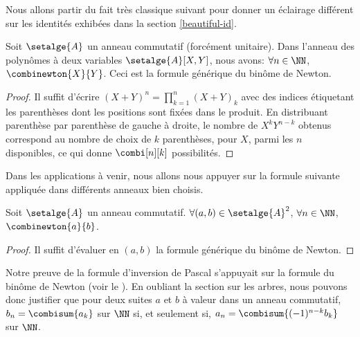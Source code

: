 Nous allons partir du fait très classique suivant pour donner un éclairage différent sur les identités exhibées dans la section \ref{beautiful-id}.




\begin{fact} \label{bino-id-formal}
    Soit $\setalge{A}$ un anneau commutatif (forcément unitaire).
    Dans l'anneau des polynômes à deux variables $\setalge{A}[X, Y]$, nous avons:
    $\forall n \in \NN$,
    $\combinewton{X}{Y}$.
    Ceci est la formule générique du binôme de Newton.
\end{fact}


\begin{proof}
    Il suffit d'écrire $(X + Y)^n = \prod_{k=1}^{n} (X + Y)_k$ avec des indices étiquetant les parenthèses dont les positions sont fixées dans le produit.
    En distribuant parenthèse par parenthèse de gauche à droite, le nombre de $X^k Y^{n-k}$ obtenus correspond au nombre de choix de $k$ parenthèses, pour $X$, parmi les $n$ disponibles, ce qui donne $\combi[n][k]$ possibilités.
\end{proof}




Dans les applications à venir, nous allons nous appuyer sur la formule suivante appliquée dans différents anneaux bien choisis.


\begin{fact} \label{bino-id-a-b}
    Soit $\setalge{A}$ un anneau commutatif.
    $\forall (a, b) \in \setalge{A}^2$,
    $\forall n \in \NN$,
    $\combinewton{a}{b}$.
\end{fact}


\begin{proof}
    Il suffit d'évaluer en $(a, b)$ la formule générique du binôme de Newton.
\end{proof}




\begin{remark}
    Notre preuve de la formule d'inversion de Pascal s'appuyait sur la formule du binôme de Newton (voir le ).
    En oubliant la section sur les arbres, nous pouvons donc justifier que pour deux suites $a$ et $b$ à valeur dans un anneau commutatif,
    $b_n = \combisum{a_k}$ sur $\NN$
    si, et seulement si,
    $a_n = \combisum{(-1)^{n-k} b_k}$ sur $\NN$.
\end{remark}
